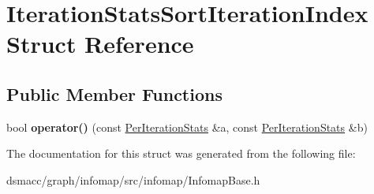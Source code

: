 \hypertarget{structIterationStatsSortIterationIndex}{}\section{Iteration\+Stats\+Sort\+Iteration\+Index Struct Reference}
\label{structIterationStatsSortIterationIndex}
\subsection*{Public Member Functions}
\begin{DoxyCompactItemize}
\item 
\mbox{\label{structIterationStatsSortIterationIndex_a9c1832e4375df12b72e9614771a521f3}} 
bool {\bfseries operator()} (const \mbox{\hyperlink{structPerIterationStats}{Per\+Iteration\+Stats}} \&a, const \mbox{\hyperlink{structPerIterationStats}{Per\+Iteration\+Stats}} \&b)
\end{DoxyCompactItemize}


The documentation for this struct was generated from the following file\+:\begin{DoxyCompactItemize}
\item 
dsmacc/graph/infomap/src/infomap/Infomap\+Base.\+h\end{DoxyCompactItemize}
